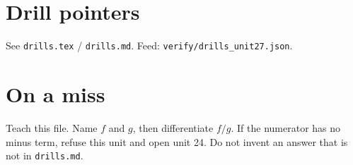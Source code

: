 \section{Drill pointers}
See \texttt{drills.tex} / \texttt{drills.md}. Feed: \texttt{verify/drills\_unit27.json}.

\section*{On a miss}
Teach this file. Name $f$ and $g$, then differentiate $f/g$. If the numerator has no minus term, refuse this unit and open unit 24. Do not invent an answer that is not in \texttt{drills.md}.

